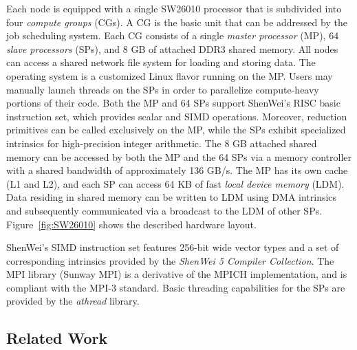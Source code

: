 Each node is equipped with a single SW26010 processor that is
subdivided into four {\em compute groups} (CGs). A CG is the basic
unit that can be addressed by the job scheduling system. Each CG
consists of a single {\em master processor} (MP), 64 {\em slave
  processors} (SPs), and 8 GB of attached DDR3 shared memory. All
nodes can access a shared network file system for loading and storing
data. The operating system is a customized Linux flavor running on the
MP.  Users may manually launch threads on the SPs in order to
parallelize compute-heavy portions of their code. Both the MP and 64
SPs support ShenWei's RISC basic instruction set, which provides
scalar and SIMD operations. Moreover, reduction primitives can be
called exclusively on the MP, while the SPs exhibit specialized
intrinsics for high-precision integer arithmetic. The 8 GB attached
shared memory can be accessed by both the MP and the 64 SPs via a
memory controller with a shared bandwidth of approximately 136
GB/s. The MP has its own cache (L1 and L2), and each SP can access 64
KB of fast {\em local device memory} (LDM). Data residing in shared
memory can be written to LDM using DMA intrinsics and subsequently
communicated via a broadcast to the LDM of other
SPs. Figure~\ref{fig:SW26010} shows the described hardware layout.

ShenWei's SIMD instruction set features 256-bit wide vector types and
a set of corresponding intrinsics provided by the \emph{ShenWei 5
  Compiler Collection}.  The MPI library (Sunway MPI) is a derivative
of the MPICH implementation, and is compliant with the MPI-3 standard.
Basic threading capabilities for the SPs are provided by the
\emph{athread} library.

\subsection{Related Work}

